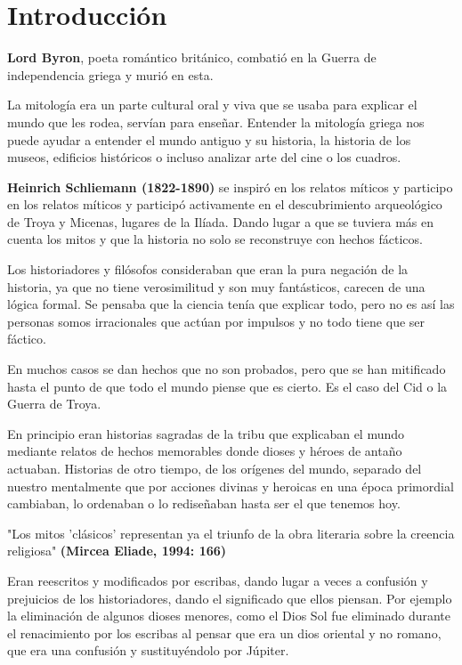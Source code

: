 \chapter{Introducción}\label{ch:introduccion}
\textbf{Lord Byron}, poeta romántico británico, combatió en la Guerra de independencia griega y murió en esta.

La mitología era un parte cultural oral y viva que se usaba para explicar el mundo que les rodea, servían para enseñar. Entender la mitología griega nos puede ayudar a entender el mundo antiguo y su historia, la historia de los museos, edificios históricos o incluso analizar arte del cine o los cuadros.

\textbf{Heinrich Schliemann (1822-1890)} se inspiró en los relatos míticos y participo en los relatos míticos y participó activamente en el descubrimiento arqueológico de Troya y Micenas, lugares de la Ilíada. Dando lugar a que se tuviera más en cuenta los mitos y que la historia no solo se reconstruye con hechos fácticos.

Los historiadores y filósofos consideraban que eran la pura negación de la historia, ya que no tiene verosimilitud y son muy fantásticos, carecen de una lógica formal. Se pensaba que la ciencia tenía que explicar todo, pero no es así las personas somos irracionales que actúan por impulsos y no todo tiene que ser fáctico.

En muchos casos se dan hechos que no son probados, pero que se han mitificado hasta el punto de que todo el mundo piense que es cierto. Es el caso del Cid o la Guerra de Troya.

En principio eran historias sagradas de la tribu que explicaban el mundo mediante relatos de hechos memorables donde dioses y héroes de antaño actuaban. Historias de otro tiempo, de los orígenes del mundo, separado del nuestro mentalmente que por acciones divinas y heroicas en una época primordial cambiaban, lo ordenaban o lo rediseñaban hasta ser el que tenemos hoy.

"Los mitos 'clásicos' representan ya el triunfo de la obra literaria sobre la creencia religiosa" \textbf{(Mircea Eliade, 1994: 166)}

Eran reescritos y modificados por escribas, dando lugar a veces a confusión y prejuicios de los historiadores, dando el significado que ellos piensan. Por ejemplo la eliminación de algunos dioses menores, como el Dios Sol fue eliminado durante el renacimiento por los escribas al pensar que era un dios oriental y no romano, que era una confusión y sustituyéndolo por Júpiter.

